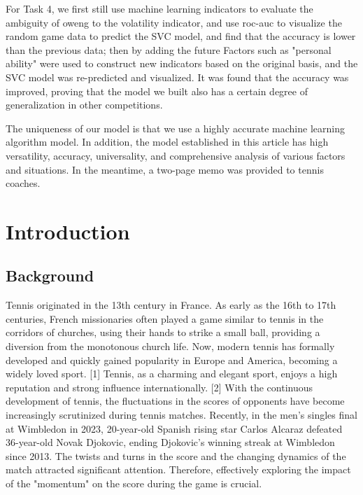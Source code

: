 \documentclass{article}
\begin{document}
For Task 4, we first still use machine learning indicators to evaluate the ambiguity of oweng to the volatility indicator, and use roc-auc to visualize the random game data to predict the SVC model, and find that the accuracy is lower than the previous data; then by adding the future Factors such as "personal ability" were used to construct new indicators based on the original basis, and the SVC model was re-predicted and visualized. It was found that the accuracy was improved, proving that the model we built also has a certain degree of generalization in other competitions.

The uniqueness of our model is that we use a highly accurate machine learning algorithm model. In addition, the model established in this article has high versatility, accuracy, universality, and comprehensive analysis of various factors and situations. In the meantime, a two-page memo was provided to tennis coaches.

\pagestyle{fancy}
\fancyhf{} %

\fancyfoot[C]{\thepage} %
\fancyfoot[L]{\textcolor{gray}{2024 MCM/ICM C 2417022}} %
\fancyfoot[R]{\textcolor{gray}{}} %

\newpage
\begin{center}
      \tableofcontents %
\end{center}
\newpage

\section{Introduction}
\subsection{Background}
Tennis originated in the 13th century in France. As early as the 16th to 17th centuries, French missionaries often played a game similar to tennis in the corridors of churches, using their hands to strike a small ball,
providing a diversion from the monotonous church life. Now, modern tennis has formally developed and quickly gained popularity in Europe and America, becoming a widely loved sport. [1] Tennis, as a charming and elegant sport, enjoys a high reputation and strong influence internationally. [2] With the continuous development of tennis, the fluctuations in the scores of opponents have become increasingly scrutinized during tennis matches. Recently, in the men's singles final at Wimbledon in 2023, 20-year-old Spanish rising star Carlos Alcaraz defeated 36-year-old Novak Djokovic, ending Djokovic's winning streak at Wimbledon since 2013. The twists and turns in the score and the changing dynamics of the match attracted significant attention. Therefore, effectively exploring the impact of the "momentum" on the score during the game is crucial.
\end{document}
